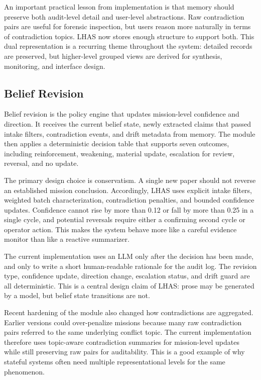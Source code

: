 \documentclass[manuscript,screen,review]{jair}
\begin{document}
An important practical lesson from implementation is that memory should preserve both audit-level detail and user-level abstractions. Raw contradiction pairs are useful for forensic inspection, but users reason more naturally in terms of contradiction topics. LHAS now stores enough structure to support both. This dual representation is a recurring theme throughout the system: detailed records are preserved, but higher-level grouped views are derived for synthesis, monitoring, and interface design.

\subsection{Belief Revision}
Belief revision is the policy engine that updates mission-level confidence and direction. It receives the current belief state, newly extracted claims that passed intake filters, contradiction events, and drift metadata from memory. The module then applies a deterministic decision table that supports seven outcomes, including reinforcement, weakening, material update, escalation for review, reversal, and no update.

The primary design choice is conservatism. A single new paper should not reverse an established mission conclusion. Accordingly, LHAS uses explicit intake filters, weighted batch characterization, contradiction penalties, and bounded confidence updates. Confidence cannot rise by more than 0.12 or fall by more than 0.25 in a single cycle, and potential reversals require either a confirming second cycle or operator action. This makes the system behave more like a careful evidence monitor than like a reactive summarizer.

The current implementation uses an LLM only after the decision has been made, and only to write a short human-readable rationale for the audit log. The revision type, confidence update, direction change, escalation status, and drift guard are all deterministic. This is a central design claim of LHAS: prose may be generated by a model, but belief state transitions are not.

Recent hardening of the module also changed how contradictions are aggregated. Earlier versions could over-penalize missions because many raw contradiction pairs referred to the same underlying conflict topic. The current implementation therefore uses topic-aware contradiction summaries for mission-level updates while still preserving raw pairs for auditability. This is a good example of why stateful systems often need multiple representational levels for the same phenomenon.
\end{document}
